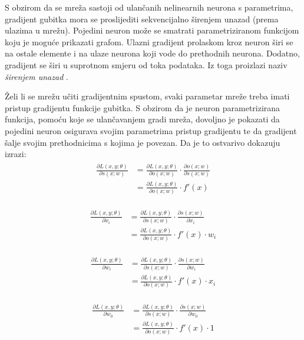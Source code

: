 \documentclass[times, utf8, numeric, diplomski]{fer}
\def\pfrac#1#2{\frac{\partial #1}{\partial #2}}
\begin{document}
S obzirom da se mreža sastoji od ulančanih nelinearnih neurona s parametrima, gradijent gubitka mora se proslijediti sekvencijalno širenjem unazad (prema ulazima u mrežu). Pojedini neuron može se smatrati parametriziranom funkcijom koju je moguće prikazati grafom. Ulazni gradijent prolaskom kroz neuron širi se na ostale elemente i na ulaze neurona koji vode do prethodnih neurona. Dodatno, gradijent se širi u suprotnom smjeru od toka podataka. Iz toga proizlazi naziv \textit{širenjem unazad} .

Želi li se mrežu učiti gradijentnim spustom, svaki parametar mreže treba imati pristup gradijentu funkcije gubitka. S obzirom da je neuron parametrizirana funkcija, pomoću koje se ulančavanjem gradi mreža, dovoljno je pokazati da pojedini neuron osigurava svojim parametrima pristup gradijentu te da gradijent šalje svojim prethodnicima s kojima je povezan. Da je to ostvarivo dokazuju izrazi:
\begin{align}
\label{eq:backprop_activation}
\begin{split}
\pfrac{L(x,y;\theta)}{s(x;w)} &= \pfrac{L(x,y;\theta)}{o(x;w)} \cdot \pfrac{o(x;w)}{s(x;w)} \\
&= \pfrac{L(x,y;\theta)}{o(x;w)} \cdot f'(x)
\end{split}
\end{align}

\begin{align}
\begin{split}
\pfrac{L(x,y;\theta)}{x_i} &= \pfrac{L(x,y;\theta)}{s(x;w)} \cdot \pfrac{s(x;w)}{x_i} \\
&= \pfrac{L(x,y;\theta)}{o(x;w)} \cdot f'(x) \cdot w_i
\end{split}
\end{align}

\begin{align} \label{eq:w_update}
\begin{split}
\pfrac{L(x,y;\theta)}{w_i} &= \pfrac{L(x,y;\theta)}{s(x;w)} \cdot \pfrac{s(x;w)}{w_i} \\
&= \pfrac{L(x,y;\theta)}{o(x;w)} \cdot f'(x) \cdot x_i
\end{split}
\end{align}

\begin{align}
\begin{split}
\pfrac{L(x,y;\theta)}{w_0} &= \pfrac{L(x,y;\theta)}{s(x;w)} \cdot \pfrac{s(x;w)}{w_0} \\
&= \pfrac{L(x,y;\theta)}{o(x;w)} \cdot f'(x) \cdot 1
\end{split}
\end{align}
\end{document}

